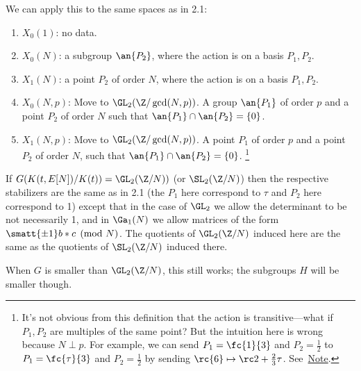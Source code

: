 We can apply this to the same spaces as in 2.1:
\begin{enumerate}
\item
$X_0(1)$: no data.
\item
$X_0(N)$: a subgroup $\an{P_2}$, where the action is on a basis $P_1,P_2$.
\item
$X_1(N)$: a point $P_2$ of order $N$, where the action is on a basis $P_1,P_2$.
\item 
$X_0(N,p)$: Move to $\GL_2(\Z/\gcd(N,p))$. A group $\an{P_1}$ of order $p$ and a point $P_2$ of order $N$ such that $\an{P_1}\cap \an{P_2}=\{0\}$.
\item
$X_1(N,p)$: Move to $\GL_2(\Z/\gcd(N,p))$. A point $P_1$ of order $p$ and a point $P_2$ of order $N$, such that $\an{P_1}\cap \an{P_2}=\{0\}$. \footnote{It's not obvious from this definition that the action is transitive---what if $P_1,P_2$ are multiples of the same point? But the intuition here is wrong because $N\perp p$. For example, we can send $P_1=\fc{1}{3}$ and $P_2=\frac{1}{2}$ to  $P_1=\fc{\tau}{3}$ and $P_2=\frac{1}{2}$ by sending $\rc{6}\mapsto \rc2+\frac23\tau$. See~\hyperlink{e-s/Y0}{Note}.}
\end{enumerate}
If $G(K(t,E[N])/K(t))=\GL_2(\Z/N))$ (or $\SL_2(\Z/N)$) then the respective stabilizers are the same as in 2.1 (the $P_1$ here correspond to $\tau$ and $P_2$ here correspond to 1) except that in the case of $\GL_2$ we allow the determinant to be not necessarily 1, and in $\Ga_1(N)$ we allow matrices of the form $\smatt{\pm 1} b * c\pmod N$.  The quotients of $\GL_2(\Z/N)$ induced here are the same as the quotients of $\SL_2(\Z/N)$ induced there. 

When $G$ is smaller than $\GL_2(\Z/N)$, this still works; the subgroups $H$ will be smaller though. 

